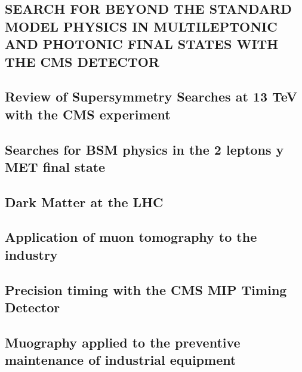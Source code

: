\documentclass[a4paper, 11pt, twoside, openright]{report}
\begin{document}
\subsection{SEARCH FOR BEYOND THE STANDARD MODEL PHYSICS IN MULTILEPTONIC AND PHOTONIC FINAL STATES WITH THE CMS DETECTOR}

\subsection{Review of Supersymmetry Searches at 13 TeV with the CMS experiment}

\subsection{Searches for BSM physics in the 2 leptons y MET final state}

\subsection{Dark Matter at the LHC}

\subsection{Application of muon tomography to the industry}

\subsection{Precision timing with the CMS MIP Timing Detector}

\subsection{Muography applied to the preventive maintenance of industrial equipment}

\end{document}
